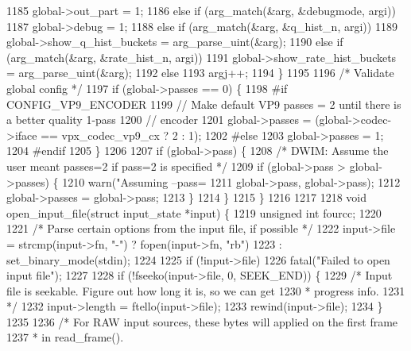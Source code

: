 \begin{DoxyCodeInclude}
{{{{{{{{{{{{{{{{{{{{{{{{{{{{{{{{1185       global->out\_part = 1;
1186     \textcolor{keywordflow}{else} \textcolor{keywordflow}{if} (arg\_match(&arg, &debugmode, argi))
1187       global->debug = 1;
1188     \textcolor{keywordflow}{else} \textcolor{keywordflow}{if} (arg\_match(&arg, &q\_hist\_n, argi))
1189       global->show\_q\_hist\_buckets = arg\_parse\_uint(&arg);
1190     \textcolor{keywordflow}{else} \textcolor{keywordflow}{if} (arg\_match(&arg, &rate\_hist\_n, argi))
1191       global->show\_rate\_hist\_buckets = arg\_parse\_uint(&arg);
1192     \textcolor{keywordflow}{else}
1193       argj++;
1194   \}
1195 
1196   \textcolor{comment}{/* Validate global config */}
1197   \textcolor{keywordflow}{if} (global->passes == 0) \{
1198 \textcolor{preprocessor}{#if CONFIG\_VP9\_ENCODER}
1199     \textcolor{comment}{// Make default VP9 passes = 2 until there is a better quality 1-pass}
1200     \textcolor{comment}{// encoder}
1201     global->passes = (global->codec->iface == vpx\_codec\_vp9\_cx ? 2 : 1);
1202 \textcolor{preprocessor}{#else}
1203     global->passes = 1;
1204 \textcolor{preprocessor}{#endif}
1205   \}
1206 
1207   \textcolor{keywordflow}{if} (global->pass) \{
1208     \textcolor{comment}{/* DWIM: Assume the user meant passes=2 if pass=2 is specified */}
1209     \textcolor{keywordflow}{if} (global->pass > global->passes) \{
1210       warn(\textcolor{stringliteral}{"Assuming --pass=%
1211            global->pass, global->pass);
1212       global->passes = global->pass;
1213     \}
1214   \}
1215 \}
1216 
1217 
1218 \textcolor{keywordtype}{void} open\_input\_file(\textcolor{keyword}{struct} input\_state *input) \{
1219   \textcolor{keywordtype}{unsigned} \textcolor{keywordtype}{int} fourcc;
1220 
1221   \textcolor{comment}{/* Parse certain options from the input file, if possible */}
1222   input->file = strcmp(input->fn, \textcolor{stringliteral}{"-"}) ? fopen(input->fn, \textcolor{stringliteral}{"rb"})
1223                 : set\_binary\_mode(stdin);
1224 
1225   \textcolor{keywordflow}{if} (!input->file)
1226     fatal(\textcolor{stringliteral}{"Failed to open input file"});
1227 
1228   \textcolor{keywordflow}{if} (!fseeko(input->file, 0, SEEK\_END)) \{
1229     \textcolor{comment}{/* Input file is seekable. Figure out how long it is, so we can get}
1230 \textcolor{comment}{     * progress info.}
1231 \textcolor{comment}{     */}
1232     input->length = ftello(input->file);
1233     rewind(input->file);
1234   \}
1235 
1236   \textcolor{comment}{/* For RAW input sources, these bytes will applied on the first frame}
1237 \textcolor{comment}{   *  in read\_frame().}
}}}}}}}}}}}}}}}}}}}}}}}}}}}}}}}}}
\end{DoxyCodeInclude}
